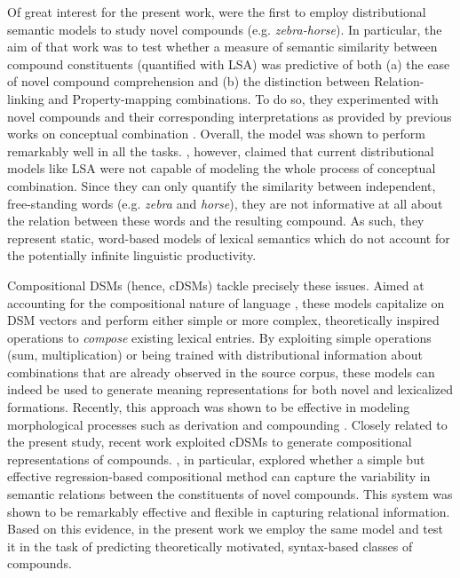 \documentclass[output=paper]{langsci/langscibook}
\begin{document}
Of great interest for the present work, \cite{lynott2001} were the first to employ distributional semantic models to study novel compounds (e.g. \emph{zebra-horse}). In particular, the aim of that work was to test whether a measure of semantic similarity between compound constituents (quantified with LSA) was predictive of both (a) the ease of novel compound comprehension and (b) the distinction between Relation-linking and Property-mapping combinations. To do so, they experimented with novel compounds and their corresponding interpretations as provided by previous works on conceptual combination \citep{wisniewskilove,gagne2000}. Overall, the model was shown to perform remarkably well in all the tasks. \cite{lynott2001}, however, claimed that current distributional models like LSA were not capable of modeling the whole process of conceptual combination. Since they can only quantify the similarity between independent, free-standing words (e.g. \emph{zebra} and \emph{horse}), they are not informative at all about the relation between these words and the resulting compound. As such, they represent static, word-based models of lexical semantics which do not account for the potentially infinite linguistic productivity.


Compositional DSMs (hence, cDSMs) tackle precisely these issues. Aimed at accounting for the compositional nature of language \citep{baronifrege}, these models capitalize on DSM vectors and perform either simple \citep{mitchell2010} or more complex, theoretically inspired operations \citep{baroni2010,guevara2010,zanzotto2010} to \emph{compose} existing lexical entries. By exploiting simple operations (sum, multiplication) or being trained with distributional information about combinations that are already observed in the source corpus, these models can indeed be used to generate meaning representations for both novel and lexicalized formations. Recently, this approach was shown to be effective in modeling morphological processes such as derivation and compounding \citep{marelli2015,gunther2016,marelli2017}. Closely related to the present study, recent work \citep{gunther2016,marelli2017} exploited cDSMs to generate compositional representations of compounds. \cite{marelli2017}, in particular, explored whether a simple but effective regression-based compositional method \citep{guevara2010} can capture the variability in semantic relations between the constituents of novel compounds. This system was shown to be remarkably effective and flexible in capturing relational information. Based on this evidence, in the present work we employ the same model and test it in the task of predicting theoretically motivated, syntax-based classes of compounds.
\end{document}
